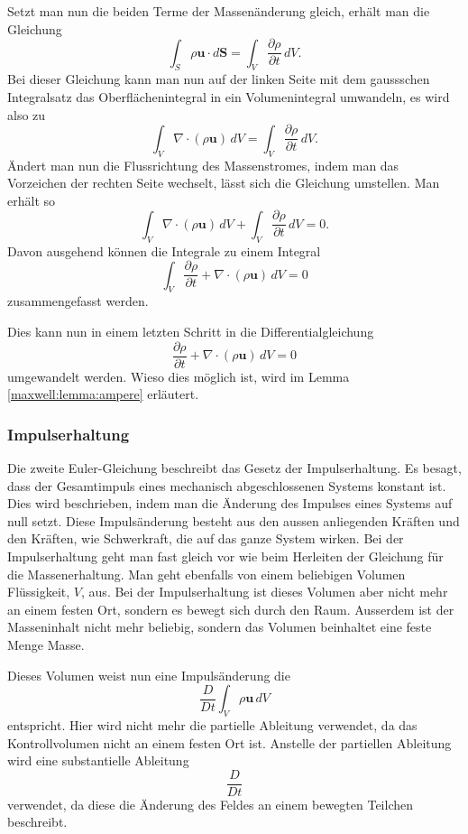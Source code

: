 Setzt man nun die beiden Terme der Massenänderung gleich, erhält man die Gleichung 
\[\int_{S}\rho\mathbf{u}\cdot d\mathbf{S} 
=
\int_{V} \frac{\partial \rho}{\partial t} \, dV .\] 
Bei dieser Gleichung kann man nun auf der linken Seite mit dem gaussschen Integralsatz das Oberflächenintegral in ein Volumenintegral umwandeln, es wird also zu
%
%
\[\int_{V}\nabla\cdot(\rho\mathbf{u}) \, dV
=
\int_{V}\frac{\partial \rho}{\partial t}  \, dV .\]
Ändert man nun die Flussrichtung des Massenstromes, indem man das Vorzeichen der rechten Seite wechselt, lässt sich die Gleichung umstellen.
Man erhält so
\[\int_{V}\nabla\cdot(\rho\mathbf{u})  \, dV + \int_{V}\frac{\partial \rho}{\partial t}  \, dV 
= 
0.\] 
Davon ausgehend können die Integrale zu einem Integral
\[\int_{V} \frac{\partial \rho}{\partial t} + \nabla\cdot(\rho\mathbf{u})  \, dV 
= 
0\]
zusammengefasst werden.

Dies kann nun in einem letzten Schritt in die Differentialgleichung
\begin{equation}
\label{openfoam:euler1}
\frac{\partial \rho}{\partial t} + \nabla\cdot(\rho\mathbf{u})  \, dV 
= 
0
\end{equation}
umgewandelt werden.
Wieso dies möglich ist, wird im Lemma \ref{maxwell:lemma:ampere} erläutert.

\subsubsection{Impulserhaltung}
Die zweite Euler-Gleichung beschreibt das Gesetz der Impulserhaltung. 
%
Es besagt, dass der Gesamtimpuls eines mechanisch abgeschlossenen Systems konstant ist.
Dies wird beschrieben, indem man die Änderung des Impulses eines Systems auf null setzt.
Diese Impulsänderung besteht aus den aussen anliegenden Kräften und den Kräften, wie Schwerkraft, die auf das ganze System wirken.
Bei der Impulserhaltung geht man fast gleich vor wie beim Herleiten der Gleichung für die Massenerhaltung.
Man geht ebenfalls von einem beliebigen Volumen Flüssigkeit, $V$, aus.
Bei der Impulserhaltung ist dieses Volumen aber nicht mehr an einem festen Ort, sondern es bewegt sich durch den Raum.
Ausserdem ist der Masseninhalt nicht mehr beliebig, sondern das Volumen beinhaltet eine feste Menge Masse.

Dieses Volumen weist nun eine Impulsänderung die
\[\frac{D}{Dt}\int_{V}\rho\mathbf{u}\, dV\]
entspricht.
Hier wird nicht mehr die partielle Ableitung verwendet, da das Kontrollvolumen nicht an einem festen Ort ist.
Anstelle der partiellen Ableitung wird eine substantielle Ableitung \[\frac{D}{Dt}\] verwendet, da diese die Änderung des Feldes an einem bewegten Teilchen beschreibt.

